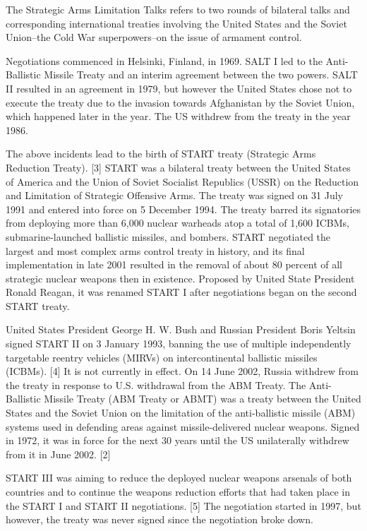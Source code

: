 \documentclass[twoside,titlepage,11pt,twocolumn,a4paper]{article}
\begin{document}
The Strategic Arms Limitation Talks refers to two rounds of bilateral 
talks and corresponding international treaties involving the United 
States and the Soviet Union--the Cold War superpowers--on the issue of 
armament control. 

Negotiations commenced in Helsinki, Finland, in 1969. SALT I led to 
the Anti-Ballistic Missile Treaty and an interim agreement between 
the two powers. SALT II resulted in an agreement in 1979, but however 
the United States chose not to execute the treaty due to the invasion 
towards Afghanistan by the Soviet Union, which happened later in the 
year. The US withdrew from the treaty in the year 1986.

The above incidents lead to the birth of START treaty (Strategic Arms 
Reduction Treaty). [3] START was a bilateral treaty between the United
States of America and the Union of Soviet Socialist Republics (USSR) 
on the Reduction and Limitation of Strategic Offensive Arms. The treaty
was signed on 31 July 1991 and entered into force on 5 December 1994. 
The treaty barred its signatories from deploying more than 6,000 nuclear
warheads atop a total of 1,600 ICBMs, submarine-launched ballistic 
missiles, and bombers. START negotiated the largest and most complex 
arms control treaty in history, and its final implementation in late 
2001 resulted in the removal of about 80 percent of all strategic nuclear
weapons then in existence. Proposed by United State President Ronald 
Reagan, it was renamed START I after negotiations began on the second 
START treaty.

United States President George H. W. Bush and Russian President Boris 
Yeltsin signed START II on 3 January 1993, banning the use of multiple 
independently targetable reentry vehicles (MIRVs) on intercontinental 
ballistic missiles (ICBMs). [4] It is not currently in effect. On 14 
June 2002, Russia withdrew from the treaty in response to U.S. withdrawal 
from the ABM Treaty. The Anti-Ballistic Missile Treaty (ABM Treaty or ABMT)
was a treaty between the United States and the Soviet Union on the 
limitation of the anti-ballistic missile (ABM) systems used in defending
areas against missile-delivered nuclear weapons. Signed in 1972, it was 
in force for the next 30 years until the US unilaterally withdrew from 
it in June 2002. [2]

START III was aiming to reduce the deployed nuclear weapons arsenals 
of both countries and to continue the weapons reduction efforts that 
had taken place in the START I and START II negotiations. [5] The 
negotiation started in 1997, but however, the treaty was never signed
since the negotiation broke down.
\end{document}
